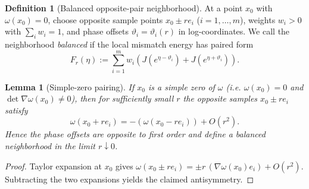 \documentclass[12pt, reqno]{amsart}
\newtheorem{lemma}[theorem]{Lemma}
\theoremstyle{definition}
\newtheorem{definition}[theorem]{Definition}
\theoremstyle{remark}
\numberwithin{equation}{section}
\newcommand{\Jc}{J}
\begin{document}
\begin{definition}[Balanced opposite-pair neighborhood]\label{def:balanced}
At a point $x_0$ with $\omega(x_0)=0$, choose opposite sample points
$x_0\pm r e_i$ ($i=1,\dots,m$), weights $w_i>0$ with
$\sum_i w_i=1$, and phase offsets $\vartheta_i=\vartheta_i(r)$ in
log-coordinates.
We call the neighborhood \emph{balanced} if the local mismatch energy has
paired form
\[
F_r(\eta):=\sum_{i=1}^m w_i\!\left(
\Jc(e^{\eta-\vartheta_i})+\Jc(e^{\eta+\vartheta_i})
\right).
\]
\end{definition}

\begin{lemma}[Simple-zero pairing]\label{lem:simple-zero-pair}
If $x_0$ is a simple zero of $\omega$ (i.e. $\omega(x_0)=0$ and
$\det\nabla\omega(x_0)\neq 0$), then for sufficiently small $r$
the opposite samples $x_0\pm r e_i$ satisfy
\[
\omega(x_0+r e_i)=-(\omega(x_0-r e_i))+O(r^2).
\]
Hence the phase offsets are opposite to first order and define a
balanced neighborhood in the limit $r\downarrow 0$.
\end{lemma}
\begin{proof}
Taylor expansion at $x_0$ gives
$\omega(x_0\pm r e_i)=\pm r\,(\nabla\omega(x_0)e_i)+O(r^2)$.
Subtracting the two expansions yields the claimed antisymmetry.
\end{proof}
\end{document}

